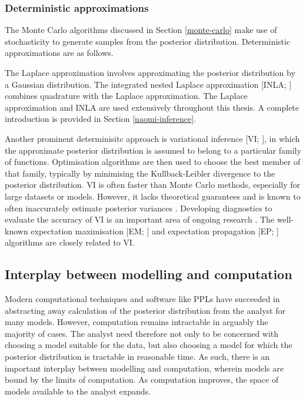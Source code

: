 \documentclass[a4paper, nobind]{templates/ociamthesis}
\begin{document}
\hypertarget{deterministic-approximations}{%
\subsubsection{Deterministic approximations}\label{deterministic-approximations}}

The Monte Carlo algorithms discussed in Section \ref{monte-carlo} make use of stochasticity to generate samples from the posterior distribution.
Deterministic approximations are as follows.

The Laplace approximation involves approximating the posterior distribution by a Gaussian distribution.
The integrated nested Laplace approximation {[}INLA; \textcite{rue2009approximate}{]} combines quadrature with the Laplace approximation.
The Laplace approximation and INLA are used extensively throughout this thesis.
A complete introduction is provided in Section \ref{naomi-inference}.

Another prominent determinisitc approach is variational inference {[}VI; \textcite{blei2017variational}{]}, in which the approximate posterior distribution is assumed to belong to a particular family of functions.
Optimisation algorithms are then used to choose the best member of that family, typically by minimising the Kullback-Leibler divergence to the posterior distribution.
VI is often faster than Monte Carlo methods, especially for large datasets or models.
However, it lacks theoretical guarantees and is known to often inaccurately estimate posterior variances \autocite{giordano2018covariances}.
Developing diagnostics to evaluate the accuracy of VI is an important area of ongoing research \autocite{yao2018yes}.
The well-known expectation maximisation {[}EM; \textcite{dempster1977maximum}{]} and expectation propagation {[}EP; \textcite{minka2001expectation}{]} algorithms are closely related to VI.

\hypertarget{interplay-between-modelling-and-computation}{%
\subsection{Interplay between modelling and computation}\label{interplay-between-modelling-and-computation}}

Modern computational techniques and software like PPLs have succeeded in abstracting away calculation of the posterior distribution from the analyst for many models.
However, computation remains intractable in arguably the majority of cases.
The analyst need therefore not only to be concerned with choosing a model suitable for the data, but also choosing a model for which the posterior distribution is tractable in reasonable time.
As such, there is an important interplay between modelling and computation, wherein models are bound by the limits of computation.
As computation improves, the space of models available to the analyst expands.
\end{document}
